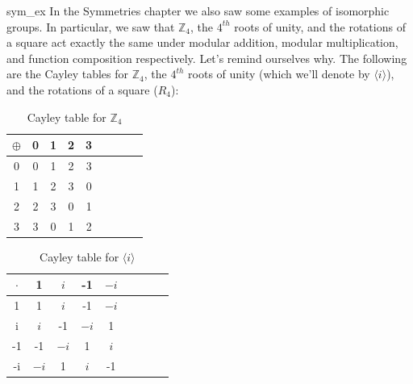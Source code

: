 


\begin{example}{sym_ex}
In the Symmetries chapter we also saw some  examples of isomorphic groups.  In particular, we saw that ${\mathbb Z_4}$, the $4^{th}$ roots of unity, and the rotations of a square act exactly the same under modular addition, modular multiplication, and function composition respectively. Let's remind ourselves why. 
The following are the Cayley tables for ${\mathbb Z_4}$, the $4^{th}$ roots of unity (which we'll denote by $\langle i \rangle$), and the rotations of a square ($R_4$):

\begin{table}[H]
\caption{Cayley table for ${\mathbb Z}_4$}
\label{Z4_add_table}
{\small
\begin{center}
\begin{tabular}{c|cccccccc}
$\oplus$ & 0 & 1 & 2 & 3  \\
\hline
0        & 0 & 1 & 2 & 3  \\
1       & 1 & 2 & 3 & 0  \\
2       & 2 & 3 & 0 & 1 \\
3       & 3 & 0 & 1 & 2 \\

\end{tabular}
\end{center}
}
\end{table}

\begin{table}[H]
\caption{Cayley table for $\langle i \rangle$}
\label{4_roots_table}
{\small
\begin{center}
\begin{tabular}{c|cccccccc}
$\cdot$ & 1 &$i$ & -1 & $-i$  \\
\hline
1        & 1 &$i$ & -1 &$-i$  \\
i       &$i$ & -1 & $-i$ & 1  \\
-1       & -1 & $-i$ & 1 & $i$ \\
-i       & $-i$ & 1 & $i$ & -1 \\


\end{tabular}
\end{center}}
\end{table}
\end{example}
